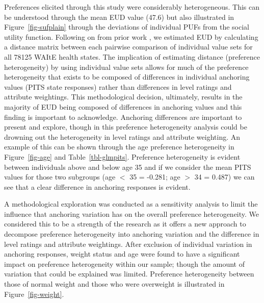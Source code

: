 \documentclass[
  number,
  preprint]{elsarticle}
\begin{document}
Preferences elicited through this study were considerably heterogeneous.
This can be understood through the mean EUD value (47.6) but also
illustrated in Figure~\ref{fig-sufplain} through the deviations of
individual PUFs from the social utility function. Following on from
prior work \citep{Schneider2024ExploringLevel}, we estimated EUD by
calculating a distance matrix between each pairwise comparison of
individual value sets for all 78125 WAItE health states. The implication
of estimating distance (preference heterogeneity) by using individual
value sets allows for much of the preference heterogeneity that exists
to be composed of differences in individual anchoring values (PITS state
responses) rather than differences in level ratings and attribute
weightings. This methodological decision, ultimately, results in the
majority of EUD being composed of differences in anchoring values and
this finding is important to acknowledge. Anchoring differences are
important to present and explore, though in this preference
heterogeneity analysis could be drowning out the heterogeneity in level
ratings and attribute weighting. An example of this can be shown through
the age preference heterogeneity in Figure~\ref{fig-age} and
Table~\ref{tbl-glmpits}. Preference heterogeneity is evident between
individuals above and below age 35 and if we consider the mean PITS
values for those two subgroups (age \(<\) 35 = -0.281; age \(>\) 34 =
0.487) we can see that a clear difference in anchoring responses is
evident.

A methodological exploration was conducted as a sensitivity analysis to
limit the influence that anchoring variation has on the overall
preference heterogeneity. We considered this to be a strength of the
research as it offers a new approach to decompose preference
heterogeneity into anchoring variation and the difference in level
ratings and attribute weightings. After exclusion of individual
variation in anchoring responses, weight status and age were found to
have a significant impact on preference heterogeneity within our sample;
though the amount of variation that could be explained was limited.
Preference heterogeneity between those of normal weight and those who
were overweight is illustrated in Figure~\ref{fig-weight}.
\end{document}
